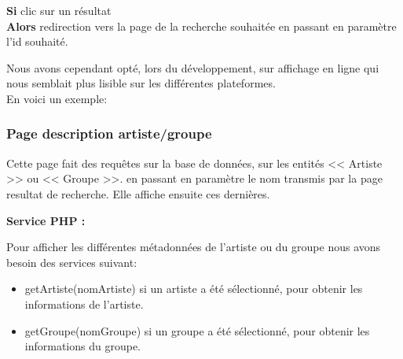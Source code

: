             \begin{paragraphe}
                \textbf{Si} clic sur un résultat\\
                \textbf{Alors} redirection vers la page de la recherche souhaitée en passant en paramètre l'id souhaité.
            \end{paragraphe}

            \begin{paragraphe}
                Nous avons cependant opté, lors du développement, sur affichage en ligne qui nous semblait plus lisible sur les différentes plateformes.\\
                En voici un exemple:
            \end{paragraphe}
            

        \clearpage

		\subsubsection{Page description artiste/groupe}
            \begin{paragraphe}
                Cette page fait des requêtes sur la base de données, sur les entités << Artiste >> ou << Groupe >>.
                 en passant en paramètre le nom transmis par la page resultat de recherche. Elle affiche ensuite ces dernières.
            \end{paragraphe}

            \begin{paragraphe}
                \textbf{Service PHP :}
            \end{paragraphe}

            \begin{paragraphe}
                Pour afficher les différentes métadonnées de l'artiste ou du groupe nous avons besoin des services suivant:
                \begin{itemize}
                        \item getArtiste(nomArtiste) si un artiste a été sélectionné, pour obtenir les informations de l'artiste.
                        \item getGroupe(nomGroupe) si un groupe a été sélectionné, pour obtenir les informations du groupe.
                \end{itemize}
            \end{paragraphe}

